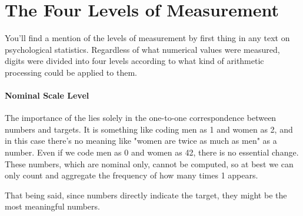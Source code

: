 \documentclass{ltjsbook}
\begin{document}
\section{The Four Levels of Measurement}
You'll find a mention of the levels of measurement by \textcite{stevens1946} first thing in any text on psychological statistics. Regardless of what numerical values were measured, digits were divided into four levels according to what kind of arithmetic processing could be applied to them.

\paragraph{Nominal Scale Level}
The importance of the  lies solely in the one-to-one correspondence between numbers and targets. It is something like coding men as 1 and women as 2, and in this case there's no meaning like "women are twice as much as men" as a number. Even if we code men as 0 and women as 42, there is no essential change. These numbers, which are nominal only, cannot be computed, so at best we can only count and aggregate the frequency of how many times 1 appears.

That being said, since numbers directly indicate the target, they might be the most meaningful numbers.

\end{document}

